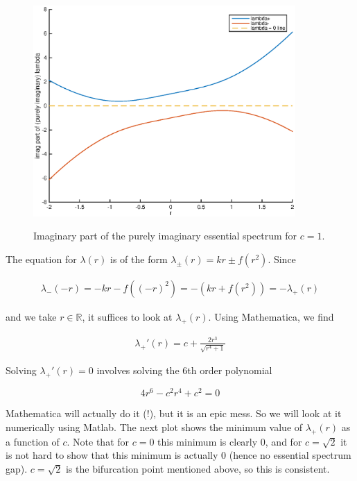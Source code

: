 \documentclass[12pt]{article}
\def\R{{\mathbb R}}
\begin{document}
\begin{figure}[H]
\centering
\includegraphics[width=10cm]{essspec1.eps}
\label{fig:essspec1}
\caption{Imaginary part of the purely imaginary essential spectrum for $c = 1$.}
\end{figure}

The equation for $\lambda(r)$ is of the form $\lambda_\pm(r) = k r \pm f(r^2)$. Since

\begin{align*}
\lambda_-(-r) = -kr - f((-r)^2) = -(kr + f(r^2)) = -\lambda_+(r)
\end{align*} 

and we take $r \in \R$, it suffices to look at $\lambda_+(r)$. Using Mathematica, we find

\begin{align*}
\lambda_+'(r) = c+\frac{2 r^3}{\sqrt{r^4+1}}
\end{align*}

Solving $\lambda_+'(r) = 0$ involves solving the 6th order polynomial

\[
4 r^6 - c^2 r^4 + c^2 = 0
\]

Mathematica will actually do it (!), but it is an epic mess. So we will look at it numerically using Matlab. The next plot shows the minimum value of $\lambda_+(r)$ as a function of $c$. Note that for $c = 0$ this minimum is clearly $0$, and for $c = \sqrt{2}$ it is not hard to show that this minimum is actually 0 (hence no essential spectrum gap). $c = \sqrt{2}$ is the bifurcation point mentioned above, so this is consistent.
\end{document}
